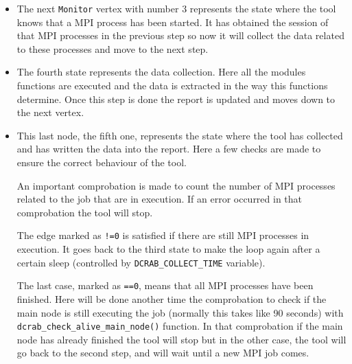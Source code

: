 \documentclass[10pt,a4paper]{report}
\begin{document}
\begin{itemize}
\begin{itemize}
    \item The next \verb+Monitor+ vertex with number 3 represents the state where the tool knows that a MPI process has been started. It has obtained the session of that MPI processes in the previous step so now it will collect the data related to these processes and move to the next step.
    \item The fourth state represents the data collection. Here all the modules functions are executed and the data is extracted in the way this functions determine. Once this step is done the report is updated and moves down to the next vertex.
    \item This last node, the fifth one, represents the state where the tool has collected and has written the data into the report. Here a few checks are made to ensure the correct behaviour of the tool.

    An important comprobation is made to count the number of MPI processes related to the job that are in execution. If an error occurred in that comprobation the tool will stop.

    The edge marked as \verb+!=0+ is satisfied if there are still MPI processes in execution. It goes back to the third state to make the loop again after a certain sleep (controlled by \verb+DCRAB_COLLECT_TIME+ variable).

    The last case, marked as \verb+==0+, means that all MPI processes have been finished. Here will be done another time the comprobation to check if the main node is still executing the job (normally this takes like 90 seconds) with \texttt{dcrab\_check\_alive\_main\_node()} function. In that comprobation if the main node has already finished the tool will stop but in the other case, the tool will go back to the second step, and will wait until a new MPI job comes.
  \end{itemize}


\end{itemize}
\end{document}
